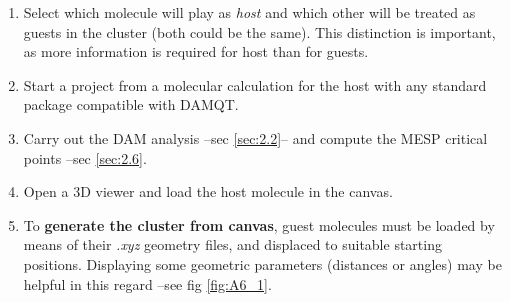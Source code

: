 \documentclass[10pt]{article}
\begin{document}
\begin{enumerate}
\item Select which molecule will play as {\it host} and which other
will be treated as guests in the cluster (both could be the same).
This distinction is important, as more information is required for host than for 
guests.

\item Start a project from a molecular calculation for the host with any 
standard package compatible with DAMQT.

\item Carry out the DAM analysis --sec \ref{sec:2.2}-- and compute the 
MESP critical points --sec \ref{sec:2.6}.

\item Open a 3D viewer and load the host molecule in the canvas.

\item To {\bf generate the cluster from canvas}, guest molecules must be loaded
by means of their {\it .xyz} geometry files,
and displaced to suitable starting positions. Displaying some geometric parameters
(distances or angles) may be helpful in this regard --see fig \ref{fig:A6_1}.


\end{enumerate}
\end{document}
